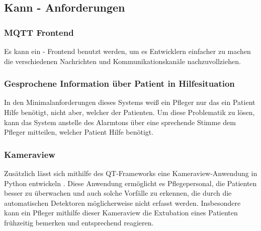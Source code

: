 \subsection{Kann - Anforderungen}

\subsubsection{MQTT Frontend}
Es kann ein  - Frontend benutzt werden, um es Entwicklern einfacher zu machen die verschiedenen Nachrichten und Kommunikationskanäle nachzuvollziehen. 

\subsubsection{Gesprochene Information über Patient in Hilfesituation}
In den Minimalanforderungen dieses Systems weiß ein Pfleger nur das ein Patient Hilfe benötigt, nicht aber, welcher der Patienten. Um diese Problematik zu lösen, kann das System anstelle des Alarmtons über eine sprechende Stimme dem Pfleger mitteilen, welcher Patient Hilfe benötigt. 

\subsubsection{Kameraview}
Zusätzlich lässt sich mithilfe des QT-Frameworks eine Kameraview-Anwendung in Python entwickeln \cite{Python} \cite{QT}. Diese Anwendung ermöglicht es Pflegepersonal, die Patienten besser zu überwachen und auch solche Vorfälle zu erkennen, die durch die automatischen Detektoren möglicherweise nicht erfasst werden. Insbesondere kann ein Pfleger mithilfe dieser Kameraview die Extubation eines Patienten frühzeitig bemerken und entsprechend reagieren.